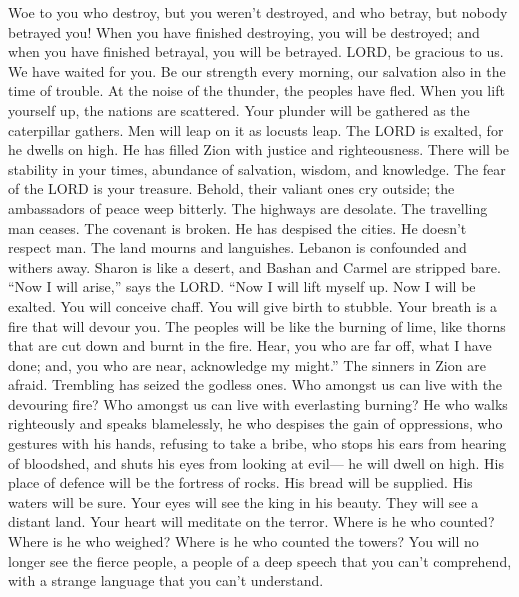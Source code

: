  Woe to you who destroy, but you weren't destroyed, and who
betray, but nobody betrayed you! When you have finished destroying, you
will be destroyed; and when you have finished betrayal, you will be
betrayed.  LORD, be gracious to us. We have waited for you.
Be our strength every morning, our salvation also in the time of
trouble.  At the noise of the thunder, the peoples have
fled. When you lift yourself up, the nations are scattered. 
Your plunder will be gathered as the caterpillar gathers. Men will leap
on it as locusts leap.  The LORD is exalted, for he dwells
on high. He has filled Zion with justice and righteousness. 
There will be stability in your times, abundance of salvation, wisdom,
and knowledge. The fear of the LORD is your treasure. 
Behold, their valiant ones cry outside; the ambassadors of peace weep
bitterly.  The highways are desolate. The travelling man
ceases. The covenant is broken. He has despised the cities. He doesn't
respect man.  The land mourns and languishes. Lebanon is
confounded and withers away. Sharon is like a desert, and Bashan and
Carmel are stripped bare.  ``Now I will arise,'' says the
LORD. ``Now I will lift myself up. Now I will be exalted. 
You will conceive chaff. You will give birth to stubble. Your breath is
a fire that will devour you.  The peoples will be like the
burning of lime, like thorns that are cut down and burnt in the fire.
 Hear, you who are far off, what I have done; and, you who
are near, acknowledge my might.''  The sinners in Zion are
afraid. Trembling has seized the godless ones. Who amongst us can live
with the devouring fire? Who amongst us can live with everlasting
burning?  He who walks righteously and speaks blamelessly,
he who despises the gain of oppressions, who gestures with his hands,
refusing to take a bribe, who stops his ears from hearing of bloodshed,
and shuts his eyes from looking at evil---  he will dwell
on high. His place of defence will be the fortress of rocks. His bread
will be supplied. His waters will be sure.  Your eyes will
see the king in his beauty. They will see a distant land. 
Your heart will meditate on the terror. Where is he who counted? Where
is he who weighed? Where is he who counted the towers?  You
will no longer see the fierce people, a people of a deep speech that you
can't comprehend, with a strange language that you can't understand.
